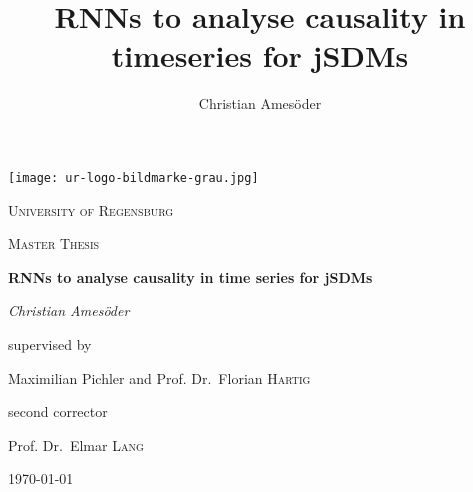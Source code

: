 \documentclass[a4paper]{report}
\begin{document}
 
	
	\author{Christian Ames\"oder}

\title {RNNs to analyse causality in timeseries for jSDMs}

\begin{titlepage}
	\centering
	\texttt{[image: ur-logo-bildmarke-grau.jpg]}\par\vspace{1cm}
	{\scshape \LARGE University of Regensburg\par}
	\vspace{1cm}
	{\scshape\Large Master Thesis\par}
	\vspace{1.5cm}
	{\huge\bfseries RNNs to analyse causality in time series for jSDMs\par}
	\vspace{2cm}
	{\Large\itshape Christian Ames\"oder\par}
	\vfill
	supervised by\par
	Maximilian Pichler and Prof. Dr.~Florian \textsc{Hartig}
	
	\vfill
	
	second corrector \par
	Prof. Dr.~Elmar \textsc{Lang}
	\vfill
	
	{\large \today\par}
\end{titlepage}

	\tableofcontents
\end{document}
